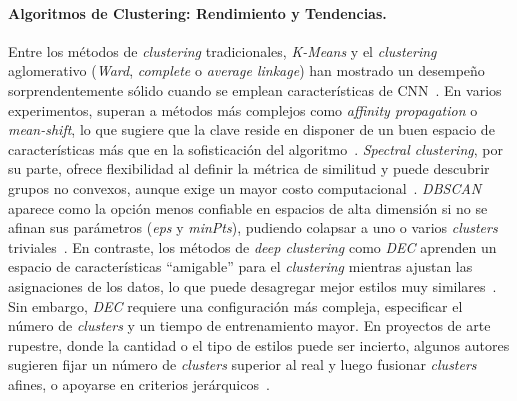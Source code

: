 \paragraph{Algoritmos de Clustering: Rendimiento y Tendencias.}
Entre los métodos de \textit{clustering} tradicionales, \textit{K-Means} y el \textit{clustering} aglomerativo (\textit{Ward}, \textit{complete} o \textit{average linkage}) han mostrado un desempeño sorprendentemente sólido cuando se emplean características de CNN~\cite{gairola2020,guerin2018}.
En varios experimentos, superan a métodos más complejos como \textit{affinity propagation} o \textit{mean-shift}, lo que sugiere que la clave reside en disponer de un buen espacio de características más que en la sofisticación del algoritmo~\cite{dangeti2024}.
\textit{Spectral clustering}, por su parte, ofrece flexibilidad al definir la métrica de similitud y puede descubrir grupos no convexos, aunque exige un mayor costo computacional~\cite{gultepe2018}.
\textit{DBSCAN} aparece como la opción menos confiable en espacios de alta dimensión si no se afinan sus parámetros (\textit{eps} y \textit{minPts}), pudiendo colapsar a uno o varios \textit{clusters} triviales~\cite{dangeti2024}.
En contraste, los métodos de \textit{deep clustering} como \textit{DEC} aprenden un espacio de características “amigable” para el \textit{clustering} mientras ajustan las asignaciones de los datos, lo que puede desagregar mejor estilos muy similares~\cite{castellano2022}.
Sin embargo, \textit{DEC} requiere una configuración más compleja, especificar el número de \textit{clusters} y un tiempo de entrenamiento mayor.
En proyectos de arte rupestre, donde la cantidad o el tipo de estilos puede ser incierto, algunos autores sugieren fijar un número de \textit{clusters} superior al real y luego fusionar \textit{clusters} afines, o apoyarse en criterios jerárquicos~\cite{dangeti2024}.


